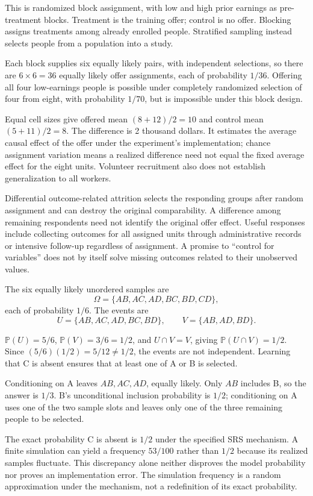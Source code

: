 \documentclass[11pt]{article}
\begin{document}
\begin{parts}
\item This is randomized block assignment, with low and high prior earnings as pre-treatment blocks. Treatment is the training offer; control is no offer. Blocking assigns treatments among already enrolled people. Stratified sampling instead selects people from a population into a study.
\item Each block supplies six equally likely pairs, with independent selections, so there are $6\times6=36$ equally likely offer assignments, each of probability $1/36$. Offering all four low-earnings people is possible under completely randomized selection of four from eight, with probability $1/70$, but is impossible under this block design.
\item Equal cell sizes give offered mean $(8+12)/2=10$ and control mean $(5+11)/2=8$. The difference is 2 thousand dollars. It estimates the average causal effect of the offer under the experiment's implementation; chance assignment variation means a realized difference need not equal the fixed average effect for the eight units. Volunteer recruitment also does not establish generalization to all workers.
\item Differential outcome-related attrition selects the responding groups after random assignment and can destroy the original comparability. A difference among remaining respondents need not identify the original offer effect. Useful responses include collecting outcomes for all assigned units through administrative records or intensive follow-up regardless of assignment. A promise to ``control for variables'' does not by itself solve missing outcomes related to their unobserved values.
\end{parts}

\begin{parts}
\item The six equally likely unordered samples are
\[
\Omega=\lbrace AB,AC,AD,BC,BD,CD\rbrace,
\]
each of probability $1/6$. The events are
\[
U=\lbrace AB,AC,AD,BC,BD\rbrace,\qquad
V=\lbrace AB,AD,BD\rbrace.
\]
\item $\mathbb P(U)=5/6$, $\mathbb P(V)=3/6=1/2$, and $U\cap V=V$, giving $\mathbb P(U\cap V)=1/2$. Since $(5/6)(1/2)=5/12\ne1/2$, the events are not independent. Learning that C is absent ensures that at least one of A or B is selected.
\item Conditioning on A leaves $AB,AC,AD$, equally likely. Only $AB$ includes B, so the answer is $1/3$. B's unconditional inclusion probability is $1/2$; conditioning on A uses one of the two sample slots and leaves only one of the three remaining people to be selected.
\item The exact probability C is absent is $1/2$ under the specified SRS mechanism. A finite simulation can yield a frequency $53/100$ rather than $1/2$ because its realized samples fluctuate. This discrepancy alone neither disproves the model probability nor proves an implementation error. The simulation frequency is a random approximation under the mechanism, not a redefinition of its exact probability.
\end{parts}
\end{document}
